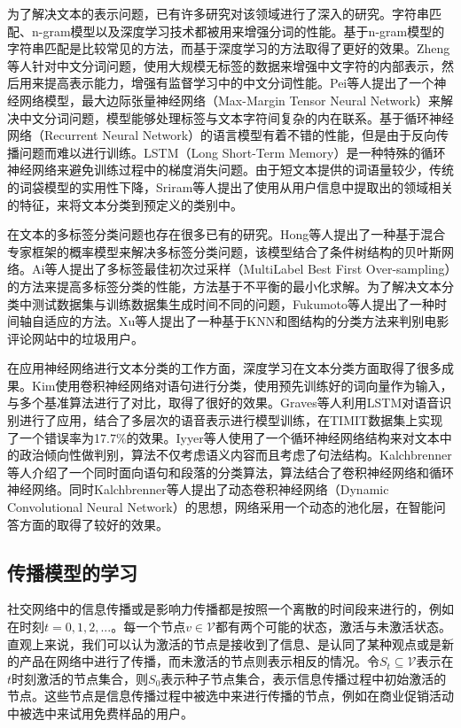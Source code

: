 为了解决文本的表示问题，已有许多研究对该领域进行了深入的研究。字符串匹配、n-gram模型以及深度学习技术都被用来增强分词的性能。基于n-gram模型的字符串匹配是比较常见的方法，而基于深度学习的方法取得了更好的效果。Zheng等人针对中文分词问题，使用大规模无标签的数据来增强中文字符的内部表示，然后用来提高表示能力，增强有监督学习中的中文分词性能。Pei等人提出了一个神经网络模型，最大边际张量神经网络（Max-Margin Tensor Neural Network）来解决中文分词问题，模型能够处理标签与文本字符间复杂的内在联系。基于循环神经网络（Recurrent Neural Network）的语言模型有着不错的性能，但是由于反向传播问题而难以进行训练。LSTM（Long Short-Term Memory）是一种特殊的循环神经网络来避免训练过程中的梯度消失问题。由于短文本提供的词语量较少，传统的词袋模型的实用性下降，Sriram等人提出了使用从用户信息中提取出的领域相关的特征，来将文本分类到预定义的类别中。

在文本的多标签分类问题也存在很多已有的研究。Hong等人提出了一种基于混合专家框架的概率模型来解决多标签分类问题，该模型结合了条件树结构的贝叶斯网络。Ai等人提出了多标签最佳初次过采样（MultiLabel Best First
Over-sampling）的方法来提高多标签分类的性能，方法基于不平衡的最小化求解。为了解决文本分类中测试数据集与训练数据集生成时间不同的问题，Fukumoto等人提出了一种时间轴自适应的方法。Xu等人提出了一种基于KNN和图结构的分类方法来判别电影评论网站中的垃圾用户。

在应用神经网络进行文本分类的工作方面，深度学习在文本分类方面取得了很多成果。Kim使用卷积神经网络对语句进行分类，使用预先训练好的词向量作为输入，与多个基准算法进行了对比，取得了很好的效果。Graves等人利用LSTM对语音识别进行了应用，结合了多层次的语音表示进行模型训练，在TIMIT数据集上实现了一个错误率为17.7\%的效果。Iyyer等人使用了一个循环神经网络结构来对文本中的政治倾向性做判别，算法不仅考虑语义内容而且考虑了句法结构。Kalchbrenner等人介绍了一个同时面向语句和段落的分类算法，算法结合了卷积神经网络和循环神经网络。同时Kalchbrenner等人提出了动态卷积神经网络（Dynamic Convolutional Neural Network）的思想，网络采用一个动态的池化层，在智能问答方面的取得了较好的效果。
\subsection{传播模型的学习}
\label{subsec1:diffusionModel}
社交网络中的信息传播或是影响力传播都是按照一个离散的时间段来进行的，例如在时刻$t = 0, 1, 2, ...$。每一个节点$v \in \mathcal{V}$都有两个可能的状态，激活与未激活状态。直观上来说，我们可以认为激活的节点是接收到了信息、是认同了某种观点或是新的产品在网络中进行了传播，而未激活的节点则表示相反的情况。令$S_t \subseteq \mathcal{V}$表示在$t$时刻激活的节点集合，则$S_0$表示种子节点集合，表示信息传播过程中初始激活的节点。这些节点是信息传播过程中被选中来进行传播的节点，例如在商业促销活动中被选中来试用免费样品的用户。

